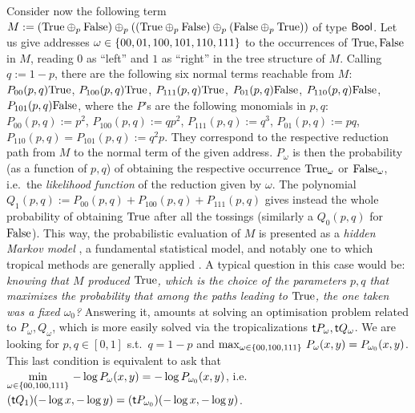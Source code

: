 \documentclass[submission,%
]{eptcs}
\begin{document}
Consider now the following term
$
 M:=(\mathrm{True} \oplus_p\mathrm{False})\oplus_p((\mathrm{True}\oplus_p\mathrm{False})\oplus_p(\mathrm{False}\oplus_p\mathrm{True}))
$
of type $\mathsf{Bool}$.
Let us give addresses $\omega\in\{00,01,100,101,110,111\}$ to the occurrences of $\mathrm{True},\mathrm{False}$ in $M$, reading $0$ as ``left'' and $1$ as ``right'' in the tree structure of $M$.
Calling $q:=1-p$, there are the following six normal terms reachable from $M$:
$P_{00}(p,q)\mathrm{True}$, 
$P_{100}(p,q)\mathrm{True}$, 
$P_{111}(p,q)\mathrm{True}$, 
$P_{01}(p,q)\mathrm{False}$, 
$P_{110}(p,q)\mathrm{False}$,
$P_{101}(p,q)\mathrm{False}$,
where the $P$'s are the following monomials in $p,q$:
$P_{00}(p,q):=p^2$,
$P_{100}(p,q):=qp^2$,
$P_{111}(p,q):=q^3$,
$P_{01}(p,q):=pq$,
$P_{110}(p,q)=P_{101}(p,q):=q^2p$.
They correspond to the respective reduction path from $M$ to the normal term of the given address.
$P_{\omega}$ is then the probability (as a function of $p,q$) of obtaining the respective occurrence $\mathrm{True}_{\omega}$ or $\mathrm{False}_\omega$,%
i.e.\ the \emph{likelihood function} of the reduction given by $\omega$.
The polynomial $Q_{1}(p,q):=P_{00}(p,q)+P_{100}(p,q)+P_{111}(p,q)$ gives instead the whole probability of obtaining $\mathrm{True}$ after all the tossings (similarly a $Q_{0}(p,q)$ for $\mathrm{False}$).
This way, the probabilistic evaluation of $M$ is presented as a \emph{hidden Markov model} \cite{Baum1966}, a fundamental statistical model, and notably one to which tropical methods are generally applied \cite{Pachter2004}.
A typical question in this case would be: \emph{knowing that $M$ produced $\mathrm{True}$, which is the choice of the parameters $p,q$ that maximizes the probability that %
among the paths leading to $\mathrm{True}$, the one taken was a fixed $\omega_0$?}
Answering it, amounts at solving an optimisation problem related to $P_{\omega}, Q_\omega$, which is more easily solved via the tropicalizations $\mathsf{t} P_{\omega},\mathsf{t} Q_{\omega}$. 
We are looking for $p,q\in[0,1]$ s.t.\ $q=1-p$ and
$\max_{\omega\in\{00,100,111\}} \, P_\omega(x,y) = P_{\omega_0}(x,y)$.
This last condition is equivalent to ask that
$\min\limits_{\omega\in\{00,100,111\}} \, -\log P_\omega(x,y) = -\log P_{\omega_0}(x,y)$,
i.e.\
$(\mathsf{t} Q_1)( -\log x, -\log y) = (\mathsf{t} P_{\omega_0})( -\log x, -\log y)$.
\end{document}
